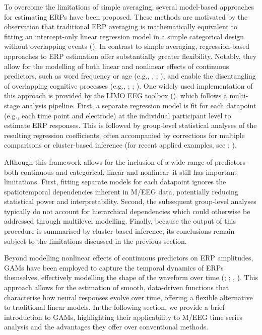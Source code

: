 \documentclass[
  doc,
  floatsintext,
  longtable,
  a4paper,
  nolmodern,
  notxfonts,
  notimes,
  colorlinks=true,linkcolor=blue,citecolor=blue,urlcolor=blue]{apa7}
\begin{document}
To overcome the limitations of simple averaging, several model-based
approaches for estimating ERPs have been proposed. These methods are
motivated by the observation that traditional ERP averaging is
mathematically equivalent to fitting an intercept-only linear regression
model in a simple categorical design without overlapping events
(). In contrast to
simple averaging, regression-based approaches to ERP estimation offer
substantially greater flexibility. Notably, they allow for the modelling
of both linear and nonlinear effects of continuous predictors, such as
word frequency or age (e.g., , ;
), and enable the
disentangling of overlapping cognitive processes (e.g.,
;
;
). One
widely used implementation of this approach is provided by the LIMO EEG
toolbox (), which follows
a multi-stage analysis pipeline. First, a separate regression model is
fit for each datapoint (e.g., each time point and electrode) at the
individual participant level to estimate ERP responses. This is followed
by group-level statistical analyses of the resulting regression
coefficients, often accompanied by corrections for multiple comparisons
or cluster-based inference (for recent applied examples, see
;
).

Although this framework allows for the inclusion of a wide range of
predictors--both continuous and categorical, linear and nonlinear--it
still has important limitations. First, fitting separate models for each
datapoint ignores the spatiotemporal dependencies inherent in M/EEG
data, potentially reducing statistical power and interpretability.
Second, the subsequent group-level analyses typically do not account for
hierarchical dependencies which could otherwise be addressed through
multilevel modelling. Finally, because the output of this procedure is
summarised by cluster-based inference, its conclusions remain subject to
the limitations discussed in the previous section.

Beyond modelling nonlinear effects of continuous predictors on ERP
amplitudes, GAMs have been employed to capture the temporal dynamics of
ERPs themselves, effectively modelling the shape of the waveform over
time (;
;
,
). This approach allows for the
estimation of smooth, data-driven functions that characterise how neural
responses evolve over time, offering a flexible alternative to
traditional linear models. In the following section, we provide a brief
introduction to GAMs, highlighting their applicability to M/EEG time
series analysis and the advantages they offer over conventional methods.
\end{document}

